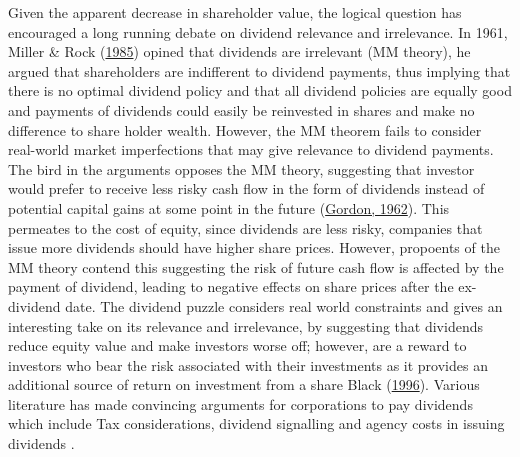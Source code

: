 \documentclass[11pt,preprint, authoryear]{elsarticle}
\numberwithin{equation}{section}
\numberwithin{figure}{section}
\numberwithin{table}{section}
\begin{document}
Given the apparent decrease in shareholder value, the logical question
has encouraged a long running debate on dividend relevance and
irrelevance. In 1961, Miller \& Rock
(\protect\hyperlink{ref-miller1985dividend}{1985}) opined that dividends
are irrelevant (MM theory), he argued that shareholders are indifferent
to dividend payments, thus implying that there is no optimal dividend
policy and that all dividend policies are equally good and payments of
dividends could easily be reinvested in shares and make no difference to
share holder wealth. However, the MM theorem fails to consider
real-world market imperfections that may give relevance to dividend
payments. The bird in the arguments opposes the MM theory, suggesting
that investor would prefer to receive less risky cash flow in the form
of dividends instead of potential capital gains at some point in the
future (\protect\hyperlink{ref-gordon1962}{Gordon, 1962}). This
permeates to the cost of equity, since dividends are less risky,
companies that issue more dividends should have higher share prices.
However, propoents of the MM theory contend this suggesting the risk of
future cash flow is affected by the payment of dividend, leading to
negative effects on share prices after the ex-dividend date. The
dividend puzzle considers real world constraints and gives an
interesting take on its relevance and irrelevance, by suggesting that
dividends reduce equity value and make investors worse off; however, are
a reward to investors who bear the risk associated with their
investments as it provides an additional source of return on investment
from a share Black (\protect\hyperlink{ref-black1996dividend}{1996}).
Various literature has made convincing arguments for corporations to pay
dividends which include Tax considerations, dividend signalling and
agency costs in issuing dividends .
\end{document}
